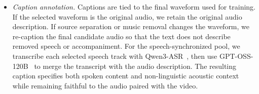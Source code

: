 \begin{itemize}
    \item \textit{Caption annotation.} Captions are tied to the final waveform used for training. If the selected waveform is the original audio, we retain the original audio description. If source separation or music removal changes the waveform, we re-caption the final candidate audio so that the text does not describe removed speech or accompaniment. For the speech-synchronized pool, we transcribe each selected speech track with Qwen3-ASR~\citep{shi2026qwen3asr}, then use GPT-OSS-120B~\citep{agarwal2025gptoss} to merge the transcript with the audio description. The resulting caption specifies both spoken content and non-linguistic acoustic context while remaining faithful to the audio paired with the video.
\end{itemize}